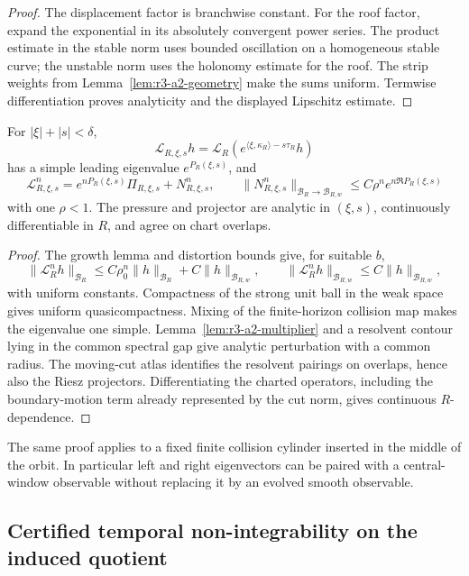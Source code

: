 \begin{proof}
The displacement factor is branchwise constant.  For the roof factor, expand
the exponential in its absolutely convergent power series.  The product
estimate in the stable norm uses bounded oscillation on a homogeneous stable
curve; the unstable norm uses the holonomy estimate for the roof.  The strip
weights from Lemma~\ref{lem:r3-a2-geometry} make the sums uniform.  Termwise
differentiation proves analyticity and the displayed Lipschitz estimate.
\end{proof}

\begin{theorem}
\label{thm:r3-a2-spectrum}
For \(|\xi|+|s|<\delta\),
\[
 \mathcal L_{R,\xi,s}h
 =\mathcal L_R\left(
 e^{\langle\xi,\kappa_R\rangle-s\tau_R}h\right)
\]
has a simple leading eigenvalue \(e^{P_R(\xi,s)}\), and
\[
 \mathcal L_{R,\xi,s}^n
 =e^{nP_R(\xi,s)}\Pi_{R,\xi,s}+N_{R,\xi,s}^n,
 \qquad
 \|N_{R,\xi,s}^n\|_{\mathcal B_R\to\mathcal B_{R,w}}
 \le C\rho^n e^{n\Re P_R(\xi,s)}
\]
with one \(\rho<1\).  The pressure and projector are analytic in
\((\xi,s)\), continuously differentiable in \(R\), and agree on chart
overlaps.
\end{theorem}

\begin{proof}
The growth lemma and distortion bounds give, for suitable \(b\),
\[
 \|\mathcal L_R^nh\|_{\mathcal B_R}
 \le C\rho_0^n\|h\|_{\mathcal B_R}+C\|h\|_{\mathcal B_{R,w}},
 \qquad
 \|\mathcal L_R^nh\|_{\mathcal B_{R,w}}
 \le C\|h\|_{\mathcal B_{R,w}},
\]
with uniform constants.  Compactness of the strong unit ball in the weak
space gives uniform quasicompactness.  Mixing of the finite-horizon collision
map makes the eigenvalue one simple.  Lemma~\ref{lem:r3-a2-multiplier} and a
resolvent contour lying in the common spectral gap give analytic perturbation
with a common radius.  The moving-cut atlas identifies the resolvent pairings
on overlaps, hence also the Riesz projectors.  Differentiating the charted
operators, including the boundary-motion term already represented by the cut
norm, gives continuous \(R\)-dependence.
\end{proof}

The same proof applies to a fixed finite collision cylinder inserted in the
middle of the orbit.  In particular left and right eigenvectors can be
paired with a central-window observable without replacing it by an evolved
smooth observable.

\subsection{Certified temporal non-integrability on the induced quotient}

